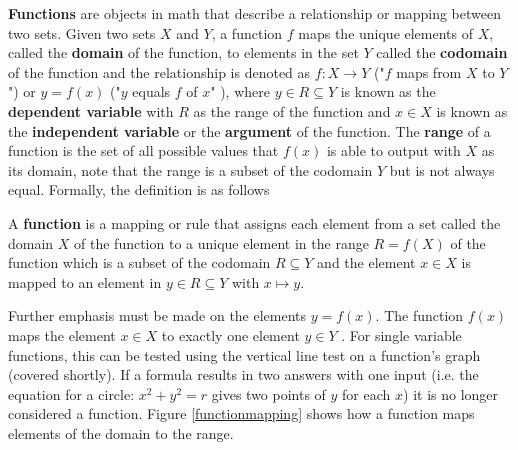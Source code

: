 \textbf{Functions} are objects in math that describe a relationship or mapping between two sets. Given two sets $X$ and $Y$, a function $f$ maps the unique elements of $X$, called the \textbf{domain} of the function, to elements in the set $Y$ called the \textbf{codomain} of the function and the relationship is denoted as $f : X \to Y$ ("$f$ maps from $X$ to $Y$") or $y = f(x)$ ("$y$ equals $f$ of $x$" \cite{understandinganalysis}), where $y \in R \subseteq Y$ is known as the \textbf{dependent variable} with $R$ as the range of the function and $x \in X$ is known as the \textbf{independent variable} or the \textbf{argument} of the function. The \textbf{range} of a function is the set of all possible values that $f(x)$ is able to output with $X$ as its domain, note that the range is a subset of the codomain $Y$ but is not always equal. Formally, the definition is as follows

\begin{definition}
    A \textbf{function} is a mapping or rule that assigns each element from a set called the domain $X$ of the function to a unique element in the range $R = f(X)$ of the function which is a subset of the codomain $R \subseteq Y$ and the element $x \in X$ is mapped to an element in $y \in R \subseteq Y$ with $x \mapsto y$.
\end{definition}

Further emphasis must be made on the elements $y = f(x)$. The function $f(x)$ maps the element $x \in X$ to exactly one element $y \in Y$ \cite{elemrealandcomplex}. For single variable functions, this can be tested using the vertical line test on a function's graph (covered shortly). If a formula results in two answers with one input (i.e. the equation for a circle: $x^2 + y^2 = r$ gives two points of $y$ for each $x$) it is no longer considered a function. Figure \ref{functionmapping} shows how a function maps elements of the domain to the range.

